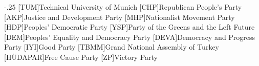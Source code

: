 \documentclass[headsepline,footsepline,footinclude=false,oneside,fontsize=11pt,paper=a4,listof=totoc,bibliography=totoc]{scrbook} %
\begin{document}


\frontmatter{}





\tableofcontents{}

\mainmatter{}










\appendix{}


\begin{acronym}
	\itemsep-.25\baselineskip
	[TUM]{Technical University of Munich}
	[CHP]{Republican People's Party}
	[AKP]{Justice and Development Party}
	[MHP]{Nationalist Movement Party}
	[HDP]{Peoples' Democratic Party}
	[YSP]{Party of the Greens and the Left Future}
	[DEM]{Peoples' Equality and Democracy Party}
	[DEVA]{Democracy and Progress Party}
	[IYI]{Good Party}
	[TBMM]{Grand National Assembly of Turkey}
	[HÜDAPAR]{Free Cause Party}
	[ZP]{Victory Party}
\end{acronym}

\listoffigures{}
\listoftables{}
\printbibliography{}
\end{document}
